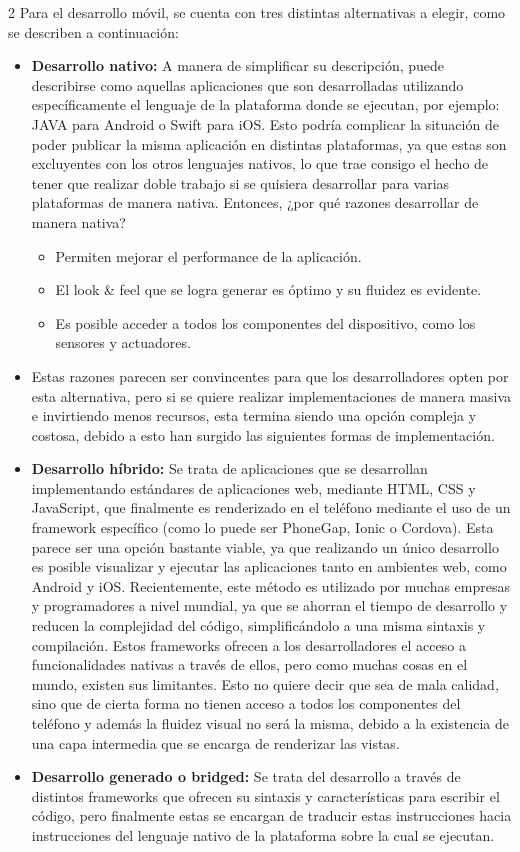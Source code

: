\documentclass[12pt,spanish,Letterpaper,openany]{book}
\begin{document}
\begin {multicols}{2}
Para el desarrollo móvil, se cuenta con tres distintas alternativas a elegir, como se describen a continuación:

\begin{itemize}
\item
  \textbf{Desarrollo nativo:} A manera de simplificar su descripción, puede describirse como aquellas aplicaciones que son desarrolladas utilizando específicamente el lenguaje de la plataforma donde se ejecutan, por ejemplo: JAVA para Android o Swift para iOS. Esto podría complicar la situación de poder publicar la misma aplicación en distintas plataformas, ya que estas son excluyentes con los otros lenguajes nativos, lo que trae consigo el hecho de tener que realizar doble trabajo si se quisiera desarrollar para varias plataformas de manera nativa. Entonces, ¿por qué razones desarrollar de manera nativa?

  \begin{itemize}
  \item
    Permiten mejorar el performance de la aplicación.
  \item
    El look \& feel que se logra generar es óptimo y su fluidez es evidente.
  \item
    Es posible acceder a todos los componentes del dispositivo, como los sensores y actuadores.
  \end{itemize}
\item
  Estas razones parecen ser convincentes para que los desarrolladores opten por esta alternativa, pero si se quiere realizar implementaciones de manera masiva e invirtiendo menos recursos, esta termina siendo una opción compleja y costosa, debido a esto han surgido las siguientes formas de implementación.
\item
  \textbf{Desarrollo híbrido:} Se trata de aplicaciones que se desarrollan implementando estándares de aplicaciones web, mediante HTML, CSS y JavaScript, que finalmente es renderizado en el teléfono mediante el uso de un framework específico (como lo puede ser PhoneGap, Ionic o Cordova). Esta parece ser una opción bastante viable, ya que realizando un único desarrollo es posible visualizar y ejecutar las aplicaciones tanto en ambientes web, como Android y iOS. Recientemente, este método es utilizado por muchas empresas y programadores a nivel mundial, ya que se ahorran el tiempo de desarrollo y reducen la complejidad del código, simplificándolo a una misma sintaxis y compilación. Estos frameworks ofrecen a los desarrolladores el acceso a funcionalidades nativas a través de ellos, pero como muchas cosas en el mundo, existen sus limitantes. Esto no quiere decir que sea de mala calidad, sino que de cierta forma no tienen acceso a todos los componentes del teléfono y además la fluidez visual no será la misma, debido a la existencia de una capa intermedia que se encarga de renderizar las vistas.
\item
  \textbf{Desarrollo generado o bridged:} Se trata del desarrollo a través de distintos frameworks que ofrecen su sintaxis y características para escribir el código, pero finalmente estas se encargan de traducir estas instrucciones hacia instrucciones del lenguaje nativo de la plataforma sobre la cual se ejecutan.
\end{itemize}


\end{multicols}
\end{document}
